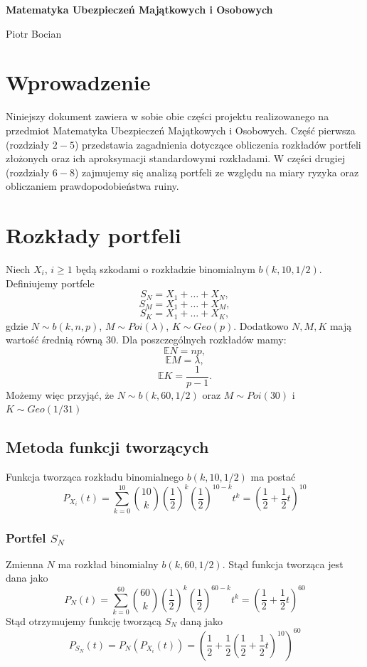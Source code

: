 \documentclass[12pt]{article}
\theoremstyle{twierdzenie}
\theoremstyle{definition}
\begin{document}
\begin{center}
\begin{Large}
\textbf{Matematyka Ubezpieczeń Majątkowych i Osobowych}\\
\end{Large}
\begin{large}
Piotr Bocian
\end{large}

\end{center}
\tableofcontents
\section{Wprowadzenie}
Niniejszy dokument zawiera w sobie obie części projektu realizowanego na przedmiot Matematyka Ubezpieczeń Majątkowych i Osobowych. Część pierwsza (rozdziały $2-5$) przedstawia zagadnienia dotyczące obliczenia rozkładów portfeli złożonych oraz ich aproksymacji standardowymi rozkładami. W części drugiej (rozdziały $6-8$) zajmujemy się analizą portfeli ze względu na miary ryzyka oraz obliczaniem prawdopodobieństwa ruiny.

\section{Rozkłady portfeli} 
Niech $X_i$, $i\geq 1$ będą szkodami o rozkładzie binomialnym $b(k,10,1/2)$.\\
Definiujemy portfele
$$S_N=X_1+\dots+X_N,$$
$$S_M=X_1+\dots+X_M,$$
$$S_K=X_1+\dots+X_K,$$
gdzie $N\sim b(k,n,p)$, $M\sim Poi(\lambda)$, $K\sim Geo(p)$. Dodatkowo $N,M,K$ mają wartość średnią równą $30$. Dla poszczególnych rozkładów mamy:
$$\mathbb{E}N=np,$$
$$\mathbb{E}M=\lambda,$$
$$\mathbb{E}K=\frac{1}{p-1}.$$
Możemy więc przyjąć, że $N\sim b(k,60,1/2)$ oraz $M\sim Poi(30)$ i $K\sim Geo(1/31)$
\subsection{Metoda funkcji tworzących}
Funkcja tworząca rozkładu binomialnego $b(k,10,1/2)$ ma postać
$$P_{X_i}(t)=\sum_{k=0}^{10}{10\choose k}\left(\frac{1}{2}\right)^k\left(\frac{1}{2}\right)^{10-k}t^k=\left(\frac{1}{2}+\frac{1}{2}t\right)^{10}$$
\subsubsection{Portfel $S_N$}
Zmienna $N$ ma rozkład binomialny $b(k,60,1/2)$. Stąd funkcja tworząca jest dana jako
$$P_N(t)=\sum_{k=0}^{60}{60\choose k}\left(\frac{1}{2}\right)^k\left(\frac{1}{2}\right)^{60-k}t^k=\left(\frac{1}{2}+\frac{1}{2}t\right)^{60}$$
Stąd otrzymujemy funkcję tworzącą $S_N$ daną jako
$$P_{S_N}(t)=P_N(P_{X_i}(t))=\left(\frac{1}{2}+\frac{1}{2}\left(\frac{1}{2}+\frac{1}{2}t\right)^{10}\right)^{60}$$
\end{document}
